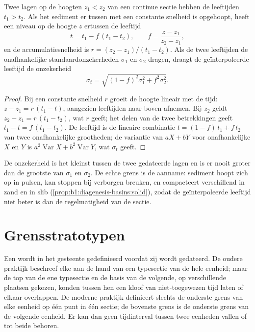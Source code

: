 \begin{proposition}\label{prop:b1:stratigraphic-scale:interpolation}
Twee lagen op de hoogten $z_1 < z_2$ van een continue sectie hebben de leeftijden $t_1 > t_2$. Als het sediment er tussen met een constante snelheid is opgehoopt, heeft een niveau op de hoogte $z$ ertussen de leeftijd
\[
  t = t_1 - f\,(t_1 - t_2), \qquad f = \frac{z - z_1}{z_2 - z_1},
\]
en de accumulatiesnelheid is $r = (z_2 - z_1)/(t_1 - t_2)$. Als de twee leeftijden de onafhankelijke standaardonzekerheden $\sigma_1$ en $\sigma_2$ dragen, draagt de geïnterpoleerde leeftijd de onzekerheid
\[
  \sigma_t = \sqrt{(1 - f)^2 \sigma_1^2 + f^2 \sigma_2^2}.
\]
\end{proposition}

\begin{proof}
Bij een constante snelheid $r$ groeit de hoogte lineair met de tijd: $z - z_1 = r\,(t_1
- t)$, aangezien leeftijden naar boven afnemen. Bij $z_2$ geldt $z_2 - z_1 = r\,(t_1 - t_2)$, wat
$r$ geeft; het delen van de twee betrekkingen geeft $t_1 - t = f\,(t_1 - t_2)$. De leeftijd
is de lineaire combinatie $t = (1 - f)\,t_1 + f\,t_2$ van twee onafhankelijke
grootheden; de variantie van $a X + b Y$ voor onafhankelijke $X$ en $Y$ is $a^2
\operatorname{Var} X + b^2 \operatorname{Var} Y$, wat $\sigma_t$ geeft.
\end{proof}

De onzekerheid is het kleinst tussen de twee gedateerde lagen en is er nooit groter dan de grootste van $\sigma_1$ en $\sigma_2$. De echte grens is de aanname: sediment hoopt zich op in pulsen, kan stoppen bij verborgen breuken, en compacteert verschillend in zand en in slib (\cref{prop:b1:diagenesis-basins:solid}), zodat de geïnterpoleerde leeftijd niet beter is dan de regelmatigheid van de sectie.

\section{Grensstratotypen}\label{sec:b1:stratigraphic-scale:gssp}

Een  wordt in het gesteente gedefinieerd voordat zij wordt gedateerd. De oudere praktijk beschreef elke  aan de hand van een typesectie van de hele eenheid; maar de top van de ene typesectie en de basis van de volgende, op verschillende plaatsen gekozen, konden tussen hen een kloof van niet-toegewezen tijd laten of elkaar overlappen. De moderne praktijk definieert slechts de onderste grens van elke eenheid op één punt in één sectie; de bovenste grens is de onderste grens van de volgende eenheid. Er kan dan geen tijdinterval tussen twee eenheden vallen of tot beide behoren.

